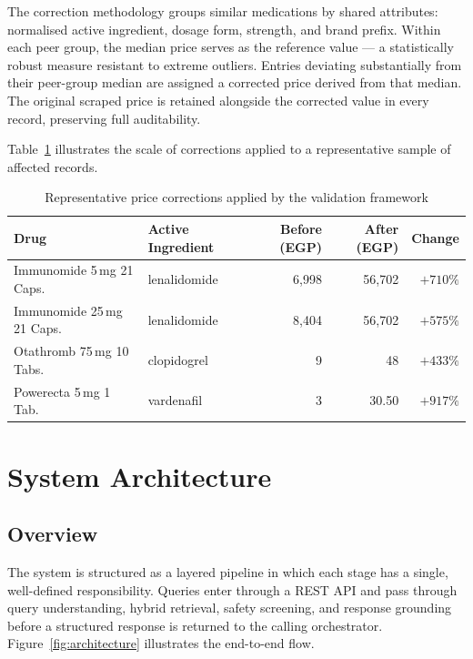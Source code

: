 \documentclass[12pt,a4paper]{article}
\begin{document}
The correction methodology groups similar medications by shared attributes:
normalised active ingredient, dosage form, strength, and brand prefix.
Within each peer group, the median price serves as the reference value ---
a statistically robust measure resistant to extreme outliers. Entries
deviating substantially from their peer-group median are assigned a
corrected price derived from that median. The original scraped price
is retained alongside the corrected value in every record, preserving
full auditability.

Table~\ref{tab:price-correction} illustrates the scale of corrections
applied to a representative sample of affected records.

\begin{table}[H]
\centering
\caption{Representative price corrections applied by the validation framework}
\label{tab:price-correction}
\renewcommand{\arraystretch}{1.3}
\begin{tabular}{llrrr}
\toprule
Drug & Active Ingredient & Before (EGP) & After (EGP) & Change \\
\midrule
Immunomide 5\,mg 21 Caps.  & lenalidomide & 6{,}998 & 56{,}702 & $+710\%$ \\
Immunomide 25\,mg 21 Caps. & lenalidomide & 8{,}404 & 56{,}702 & $+575\%$ \\
Otathromb 75\,mg 10 Tabs.  & clopidogrel  & 9       & 48       & $+433\%$ \\
Powerecta 5\,mg 1 Tab.     & vardenafil   & 3       & 30.50    & $+917\%$ \\
\bottomrule
\end{tabular}
\end{table}

\section{System Architecture}

\subsection{Overview}

The system is structured as a layered pipeline in which each stage has a
single, well-defined responsibility. Queries enter through a REST API and
pass through query understanding, hybrid retrieval, safety screening, and
response grounding before a structured response is returned to the calling
orchestrator. Figure~\ref{fig:architecture} illustrates the end-to-end flow.
\end{document}
